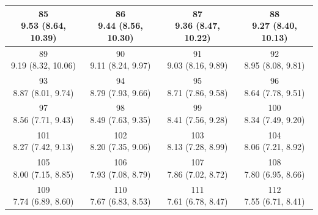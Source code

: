 \begin{table}[htbp]
\begin{tabular}{cccc}
\hline
\shortstack[c]{85\\9.53 (8.64, 10.39)} & \shortstack[c]{86\\9.44 (8.56, 10.30)} & \shortstack[c]{87\\9.36 (8.47, 10.22)} & \shortstack[c]{88\\9.27 (8.40, 10.13)} \\
\hline
\shortstack[c]{89\\9.19 (8.32, 10.06)} & \shortstack[c]{90\\9.11 (8.24, 9.97)} & \shortstack[c]{91\\9.03 (8.16, 9.89)} & \shortstack[c]{92\\8.95 (8.08, 9.81)} \\
\hline
\shortstack[c]{93\\8.87 (8.01, 9.74)} & \shortstack[c]{94\\8.79 (7.93, 9.66)} & \shortstack[c]{95\\8.71 (7.86, 9.58)} & \shortstack[c]{96\\8.64 (7.78, 9.51)} \\
\hline
\shortstack[c]{97\\8.56 (7.71, 9.43)} & \shortstack[c]{98\\8.49 (7.63, 9.35)} & \shortstack[c]{99\\8.41 (7.56, 9.28)} & \shortstack[c]{100\\8.34 (7.49, 9.20)} \\
\hline
\shortstack[c]{101\\8.27 (7.42, 9.13)} & \shortstack[c]{102\\8.20 (7.35, 9.06)} & \shortstack[c]{103\\8.13 (7.28, 8.99)} & \shortstack[c]{104\\8.06 (7.21, 8.92)} \\
\hline
\shortstack[c]{105\\8.00 (7.15, 8.85)} & \shortstack[c]{106\\7.93 (7.08, 8.79)} & \shortstack[c]{107\\7.86 (7.02, 8.72)} & \shortstack[c]{108\\7.80 (6.95, 8.66)} \\
\hline
\shortstack[c]{109\\7.74 (6.89, 8.60)} & \shortstack[c]{110\\7.67 (6.83, 8.53)} & \shortstack[c]{111\\7.61 (6.78, 8.47)} & \shortstack[c]{112\\7.55 (6.71, 8.41)} \\
\hline

\end{tabular}
\end{table}
